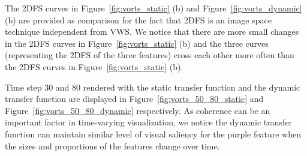 The 2DFS curves in Figure~\ref{fig:vorts_static} (b) and Figure~\ref{fig:vorts_dynamic} (b) are provided as comparison for the fact that 2DFS is an image space technique independent from VWS. We notice that there are more small changes in the 2DFS curves in Figure~\ref{fig:vorts_static} (b) and the three curves (representing the 2DFS of the three features) cross each other more often than the 2DFS curves in Figure~\ref{fig:vorts_static} (b).

Time step 30 and 80 rendered with the static transfer function and the dynamic transfer function are displayed in Figure~\ref{fig:vorts_50_80_static} and Figure~\ref{fig:vorts_50_80_dynamic} respectively. As coherence can be an important factor in time-varying visualization, we notice the dynamic transfer function can maintain similar level of visual saliency for the purple feature when the sizes and proportions of the features change over time.


%

%


